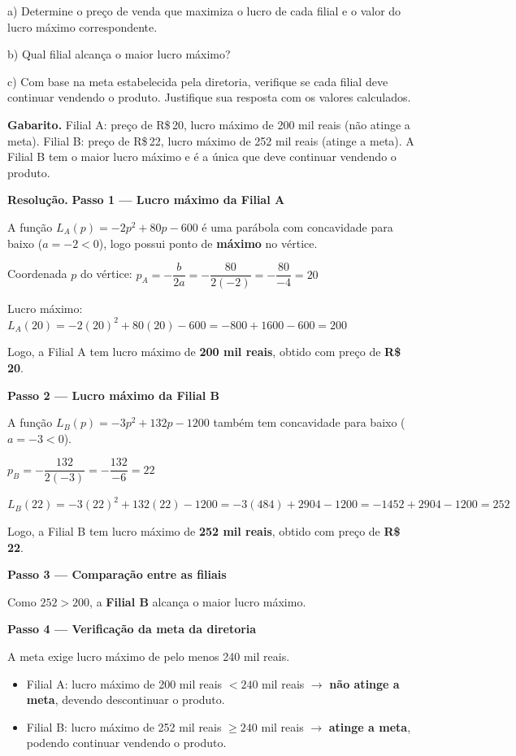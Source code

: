\documentclass[11pt,a4paper]{article}
\begin{document}
a) Determine o preço de venda que maximiza o lucro de cada filial e o valor do lucro máximo correspondente.

b) Qual filial alcança o maior lucro máximo?

c) Com base na meta estabelecida pela diretoria, verifique se cada filial deve continuar vendendo o produto. Justifique sua resposta com os valores calculados.

\textbf{Gabarito.} Filial A: preço de R\$\,20, lucro máximo de 200 mil reais (não atinge a meta). Filial B: preço de R\$\,22, lucro máximo de 252 mil reais (atinge a meta). A Filial B tem o maior lucro máximo e é a única que deve continuar vendendo o produto.

\textbf{Resolução.} \textbf{Passo 1 — Lucro máximo da Filial A}

A função $L_A(p) = -2p^2 + 80p - 600$ é uma parábola com concavidade para baixo ($a = -2 < 0$), logo possui ponto de \textbf{máximo} no vértice.

Coordenada $p$ do vértice: $p_A = -\dfrac{b}{2a} = -\dfrac{80}{2(-2)} = -\dfrac{80}{-4} = 20$

Lucro máximo: $L_A(20) = -2(20)^2 + 80(20) - 600 = -800 + 1600 - 600 = 200$

Logo, a Filial A tem lucro máximo de \textbf{200 mil reais}, obtido com preço de \textbf{R\$\,20}.

\textbf{Passo 2 — Lucro máximo da Filial B}

A função $L_B(p) = -3p^2 + 132p - 1200$ também tem concavidade para baixo ($a=-3<0$).

$p_B = -\dfrac{132}{2(-3)} = -\dfrac{132}{-6} = 22$

$L_B(22) = -3(22)^2 + 132(22) - 1200 = -3(484) + 2904 - 1200 = -1452 + 2904 - 1200 = 252$

Logo, a Filial B tem lucro máximo de \textbf{252 mil reais}, obtido com preço de \textbf{R\$\,22}.

\textbf{Passo 3 — Comparação entre as filiais}

Como $252 > 200$, a \textbf{Filial B} alcança o maior lucro máximo.

\textbf{Passo 4 — Verificação da meta da diretoria}

A meta exige lucro máximo de pelo menos 240 mil reais.

\begin{itemize}[nosep,leftmargin=*]
\item Filial A: lucro máximo de 200 mil reais $< 240$ mil reais $\to$ \textbf{não atinge a meta}, devendo descontinuar o produto.
\item Filial B: lucro máximo de 252 mil reais $\geq 240$ mil reais $\to$ \textbf{atinge a meta}, podendo continuar vendendo o produto.
\end{itemize}
\end{document}
